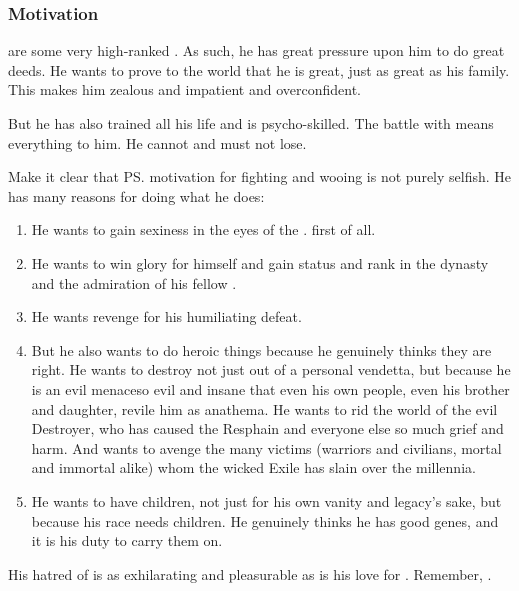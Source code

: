 \subsubsection{Motivation}
 are some very high-ranked \resphain. 
As such, he has great pressure upon him to do great deeds. 
He wants to prove to the world that he is great, just as great as his family. 
This makes him zealous and impatient and overconfident. 

But he has also trained all his life and is psycho-skilled. 
The battle with \Ishnaruchaefir{} means everything to him. 
He cannot and must not lose. 

Make it clear that \ps{\Teshrial} motivation for fighting \Ishnaruchaefir{} and wooing \Firaxel{} is not purely selfish. 
He has many reasons for doing what he does:

\begin{enumerate}
  \item 
    He wants to gain sexiness in the eyes of the \resviel. 
    \Firaxel{} first of all.
  \item 
    He wants to win glory for himself and gain status and rank in the dynasty and the admiration of his fellow \resphain. 
  \item 
    He wants revenge for his humiliating defeat. 
  \item 
    But he also wants to do heroic things because he genuinely thinks they are right. 
    He wants to destroy \Ishnaruchaefir{} not just out of a personal vendetta, but because he is an evil menace\dash so evil and insane that even his own people, even his brother and daughter, revile him as anathema. 
    He wants to rid the world of the evil Destroyer, who has caused the Resphain and everyone else so much grief and harm. 
    And \Teshrial{} wants to avenge the many victims (warriors and civilians, mortal and immortal alike) whom the wicked Exile has slain over the millennia. 
  \item 
    He wants to have children, not just for his own vanity and legacy's sake, but because his race needs children. 
    He genuinely thinks he has good genes, and it is his duty to carry them on. 
\end{enumerate}

His hatred of \Ishnaruchaefir is as exhilarating and pleasurable as is his love for \Firaxel. 
Remember, .





